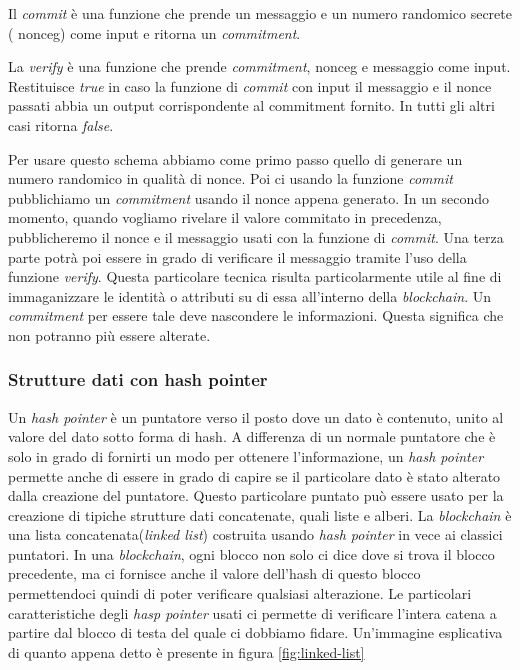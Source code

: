 Il \emph{commit} è una funzione che prende un messaggio e un numero randomico secrete ( \gls{nonceg}\glsfirstoccur) come input e ritorna un  \emph{commitment}.

La \emph{verify} è una funzione che prende \emph{commitment}, \gls{nonceg} e messaggio come input. Restituisce \emph{true} in caso la funzione di \emph{commit} con input il messaggio e il nonce passati abbia un output corrispondente al commitment fornito. In tutti gli altri casi ritorna \emph{false}.

Per usare questo schema abbiamo come primo passo quello di generare un numero randomico in qualità di nonce. Poi ci usando la funzione \emph{commit} pubblichiamo un \emph{commitment} usando il nonce appena generato. In un secondo momento, quando vogliamo rivelare il valore commitato in precedenza, pubblicheremo il nonce e il messaggio usati con la funzione di \emph{commit}. Una terza parte potrà poi essere in grado di verificare il messaggio tramite l'uso della funzione \emph{verify}.
Questa particolare tecnica risulta particolarmente utile al fine di immaganizzare le identità o attributi su di essa all'interno della \emph{blockchain}. Un \emph{commitment} per essere tale deve nascondere le informazioni. Questa significa che non potranno più essere alterate. 

\subsubsection{Strutture dati con hash pointer}
Un \emph{hash pointer} è un puntatore verso il posto dove un dato è contenuto, unito al valore del dato sotto forma di hash. A differenza di un normale puntatore che è solo in grado di fornirti un modo per ottenere l'informazione, un \emph{hash pointer} permette anche di essere in grado di capire se il particolare dato è stato alterato dalla creazione del puntatore. Questo particolare puntato può essere usato per la creazione di tipiche strutture dati concatenate, quali liste e alberi. La \emph{blockchain} è una lista concatenata(\emph{linked list}) costruita usando \emph{hash pointer} in vece ai classici puntatori. In una \emph{blockchain}, ogni blocco non solo ci dice dove si trova il blocco precedente, ma ci fornisce anche il valore dell'hash di questo blocco permettendoci quindi di poter verificare qualsiasi alterazione. Le particolari caratteristiche degli \emph{hasp pointer} usati ci permette di verificare l'intera catena a partire dal blocco di testa del quale ci dobbiamo fidare. 
Un'immagine esplicativa di quanto appena detto è presente in figura \ref{fig:linked-list}


